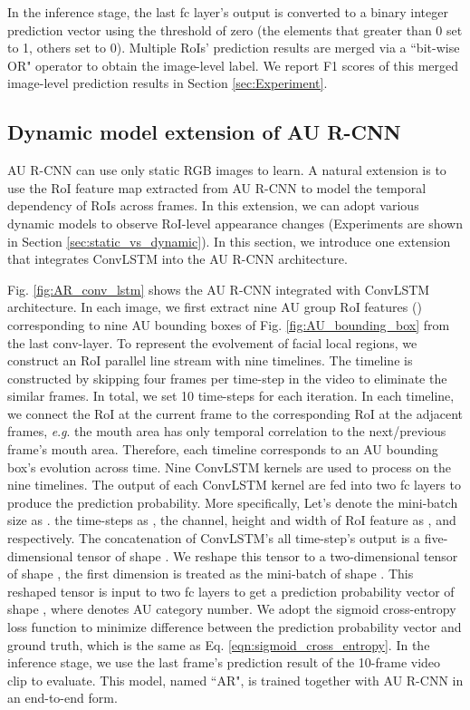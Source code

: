 \documentclass[5p,twocolumn]{elsarticle}
\newcommand{\eg}{\textit{e}.\textit{g}. }
\begin{document}
In the inference stage, the last fc layer's output is converted to a binary integer prediction vector using the threshold of zero (the elements that greater than 0 set to 1, others set to 0). Multiple RoIs' prediction results are merged via a ``bit-wise OR" operator to obtain the image-level label. We report F1 scores of this merged image-level prediction results in Section \ref{sec:Experiment}.
 

\subsection{Dynamic model extension of AU R-CNN}
\label{sec:method_AR_conv-lstm}
AU R-CNN can use only static RGB images to learn. A natural extension is to use the RoI feature map extracted from AU R-CNN to model the temporal dependency of RoIs across frames. In this extension, we can adopt various dynamic models to observe RoI-level appearance changes (Experiments are shown in Section \ref{sec:static_vs_dynamic}). In this section, we introduce one extension that integrates ConvLSTM \cite{xingjian2015convolutional} into the AU R-CNN architecture.



Fig. \ref{fig:AR_conv_lstm} shows the AU R-CNN integrated with ConvLSTM architecture. In each image, we first extract nine AU group RoI features () corresponding to nine AU bounding boxes of Fig. \ref{fig:AU_bounding_box} from the last conv-layer. To represent the evolvement of facial local regions, we construct an RoI parallel line stream with nine timelines. The timeline is constructed by skipping four frames per time-step in the video to eliminate the similar frames.  In total, we set 10 time-steps for each iteration. In each timeline, we connect the RoI at the current frame to the corresponding RoI at the adjacent frames, \eg the mouth area has only temporal correlation to the next/previous frame's mouth area. Therefore, each timeline corresponds to an AU bounding box's evolution across time. Nine ConvLSTM kernels are used to process on the nine timelines. The output of each ConvLSTM kernel are fed into two fc layers to produce the prediction probability. More specifically, Let's denote the mini-batch size as . the time-steps as , the channel, height and width of RoI feature as ,  and  respectively. The concatenation of ConvLSTM's all time-step's output is a five-dimensional tensor of shape . We reshape this tensor to a two-dimensional tensor of shape , the first dimension is treated as the mini-batch of shape . This reshaped tensor is input to two fc layers to get a prediction probability vector of shape , where  denotes AU category number.
We adopt the sigmoid cross-entropy loss function to minimize difference between the prediction probability vector and ground truth, which is the same as Eq. \ref{eqn:sigmoid_cross_entropy}. In the inference stage, we use the last frame's prediction result of the 10-frame video clip to evaluate. This model, named ``AR", is trained together with AU R-CNN in an end-to-end form. 
\end{document}
